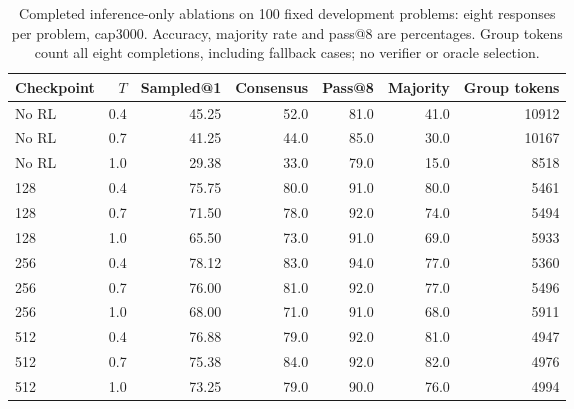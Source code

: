 \begin{table}[t]
\centering
\caption{Completed inference-only ablations on 100 fixed development problems: eight responses per problem, cap3000. Accuracy, majority rate and pass@8 are percentages. Group tokens count all eight completions, including fallback cases; no verifier or oracle selection.}
\label{tab:inference_temperature}
\footnotesize
\setlength{\tabcolsep}{4pt}
\begin{tabular}{lrrrrrr}
\toprule
Checkpoint & $T$ & Sampled@1 & Consensus & Pass@8 & Majority & Group tokens\\
\midrule
No RL & 0.4 & 45.25 & 52.0 & 81.0 & 41.0 & 10912\\
No RL & 0.7 & 41.25 & 44.0 & 85.0 & 30.0 & 10167\\
No RL & 1.0 & 29.38 & 33.0 & 79.0 & 15.0 & 8518\\
128 & 0.4 & 75.75 & 80.0 & 91.0 & 80.0 & 5461\\
128 & 0.7 & 71.50 & 78.0 & 92.0 & 74.0 & 5494\\
128 & 1.0 & 65.50 & 73.0 & 91.0 & 69.0 & 5933\\
256 & 0.4 & 78.12 & 83.0 & 94.0 & 77.0 & 5360\\
256 & 0.7 & 76.00 & 81.0 & 92.0 & 77.0 & 5496\\
256 & 1.0 & 68.00 & 71.0 & 91.0 & 68.0 & 5911\\
512 & 0.4 & 76.88 & 79.0 & 92.0 & 81.0 & 4947\\
512 & 0.7 & 75.38 & 84.0 & 92.0 & 82.0 & 4976\\
512 & 1.0 & 73.25 & 79.0 & 90.0 & 76.0 & 4994\\
\bottomrule
\end{tabular}
\end{table}
